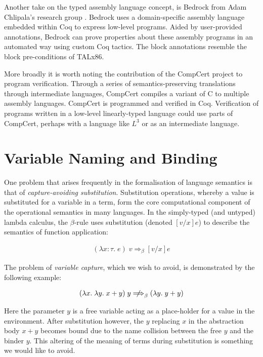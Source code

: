 \documentclass[]{unswthesis}
\newcommand{\SSPHS}{\text{SSPHS }}
\let\i\textit
\begin{document}
Another take on the typed assembly language concept, is Bedrock from Adam Chlipala's research group \cite{chlipala11}. Bedrock uses a domain-specific assembly language embedded within Coq to express low-level programs. Aided by user-provided annotations, Bedrock can prove properties about these assembly programs in an automated way using custom Coq tactics. The block annotations resemble the block pre-conditions of TALx86.

More broadly it is worth noting the contribution of the CompCert \cite{leroy09} project to program verification. Through a series of semantics-preserving translations through intermediate languages, CompCert compiles a variant of C to multiple assembly languages. CompCert is programmed and verified in Coq. Verification of programs written in a low-level linearly-typed language could use parts of CompCert, perhaps with a language like $L^3$ or \SSPHS as an intermediate language.

\section{Variable Naming and Binding}
\label{sec:var_naming}

One problem that arises frequently in the formalisation of language semantics is that of \i{capture-avoiding substitution}. Substitution operations, whereby a value is substituted for a variable in a term, form the core computational component of the operational semantics in many languages. In the simply-typed (and untyped) lambda calculus, the $\beta$-rule uses substitution (denoted $[v/x]e$) to describe the semantics of function application:

\begin{eqnarray*}
(\lambda x : \tau. \; e) \; v \Longrightarrow_\beta [v/x]e
\end{eqnarray*}

The problem of \i{variable capture}, which we wish to avoid, is demonstrated by the following example:

\begin{eqnarray*}
(\lambda x. \; \lambda y. \; x + y) \; y \; {\centernot\Longrightarrow}_\beta \; (\lambda y. \; y + y)
\end{eqnarray*}

Here the parameter $y$ is a free variable acting as a place-holder for a value in the environment. After substitution however, the $y$ replacing $x$ in the abstraction body $x + y$ becomes bound due to the name collision between the free $y$ and the binder $y$. This altering of the meaning of terms during substitution is something we would like to avoid.
\end{document}
